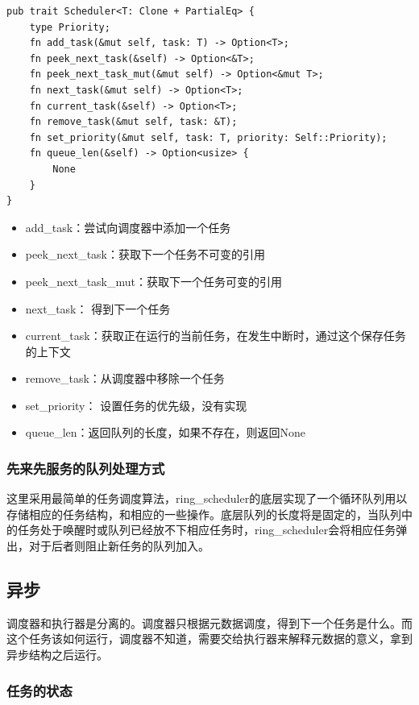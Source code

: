 \begin{lstlisting}[caption=调度器的接口约束]
pub trait Scheduler<T: Clone + PartialEq> {
    type Priority;
    fn add_task(&mut self, task: T) -> Option<T>;
    fn peek_next_task(&self) -> Option<&T>;
    fn peek_next_task_mut(&mut self) -> Option<&mut T>;
    fn next_task(&mut self) -> Option<T>;
    fn current_task(&self) -> Option<T>;
    fn remove_task(&mut self, task: &T);
    fn set_priority(&mut self, task: T, priority: Self::Priority);
    fn queue_len(&self) -> Option<usize> {
        None
    }
}
\end{lstlisting}


\begin{itemize}
\item add\_task：尝试向调度器中添加一个任务
\item peek\_next\_task：获取下一个任务不可变的引用
\item peek\_next\_task\_mut：获取下一个任务可变的引用
\item next\_task： 得到下一个任务
\item current\_task：获取正在运行的当前任务，在发生中断时，通过这个保存任务的上下文
\item remove\_task：从调度器中移除一个任务
\item set\_priority： 设置任务的优先级，没有实现
\item queue\_len：返回队列的长度，如果不存在，则返回None
\end{itemize}


\subsubsection{先来先服务的队列处理方式}

这里采用最简单的任务调度算法，ring\_scheduler的底层实现了一个循环队列用以存储相应的任务结构，和相应的一些操作。底层队列的长度将是固定的，当队列中的任务处于唤醒时或队列已经放不下相应任务时，ring\_scheduler会将相应任务弹出，对于后者则阻止新任务的队列加入。

\subsection{异步}

调度器和执行器是分离的。调度器只根据元数据调度，得到下一个任务是什么。而这个任务该如何运行，调度器不知道，需要交给执行器来解释元数据的意义，拿到异步结构之后运行。

\subsubsection{任务的状态}

